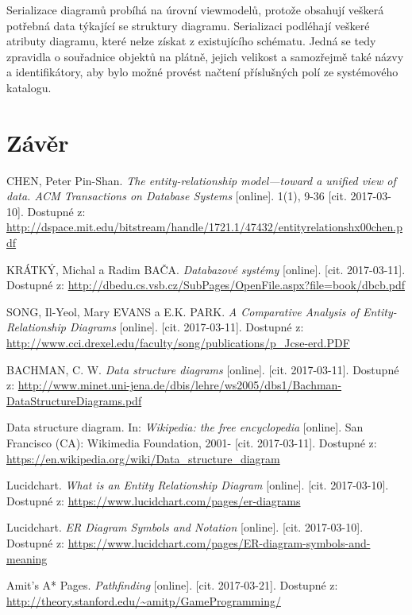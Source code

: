 \documentclass[czech,bachelor,public,dept460,male,oneside]{diploma}
\begin{document}
	Serializace diagramů probíhá na úrovní viewmodelů, protože obsahují veškerá potřebná data týkající se struktury diagramu. Serializaci podléhají veškeré atributy diagramu, které nelze získat z existujícího schématu. Jedná se tedy zpravidla o souřadnice objektů na plátně, jejich velikost a samozřejmě také názvy a identifikátory, aby bylo možné provést načtení příslušných polí ze systémového katalogu. 

\newpage
\section{Závěr}

\newpage
\begin{thebibliography}{99}
	 CHEN, Peter Pin-Shan. \textit{The entity-relationship model---toward a unified view of data. ACM Transactions on Database Systems} [online]. 1(1), 9-36 [cit. 2017-03-10]. Dostupné z: \url{http://dspace.mit.edu/bitstream/handle/1721.1/47432/entityrelationshx00chen.pdf}
	
	 KRÁTKÝ, Michal a Radim BAČA. \textit{Databazové systémy} [online]. [cit. 2017-03-11]. Dostupné z: \url{http://dbedu.cs.vsb.cz/SubPages/OpenFile.aspx?file=book/dbcb.pdf}
	
	 SONG, Il-Yeol, Mary EVANS a E.K. PARK. \textit{A Comparative Analysis of Entity-Relationship Diagrams} [online]. [cit. 2017-03-11]. Dostupné z: \url{http://www.cci.drexel.edu/faculty/song/publications/p_Jcse-erd.PDF}
	
	 BACHMAN, C. W. \textit{Data structure diagrams} [online]. [cit. 2017-03-11]. Dostupné z: \url{http://www.minet.uni-jena.de/dbis/lehre/ws2005/dbs1/Bachman-DataStructureDiagrams.pdf}
	
	 Data structure diagram. In: \textit{Wikipedia: the free encyclopedia} [online]. San Francisco (CA): Wikimedia Foundation, 2001- [cit. 2017-03-11]. Dostupné z: \url{https://en.wikipedia.org/wiki/Data_structure_diagram}
	
	Lucidchart. \textit{What is an Entity Relationship Diagram} [online]. [cit. 2017-03-10]. Dostupné z: \url{https://www.lucidchart.com/pages/er-diagrams}
	
	Lucidchart. \textit{ER Diagram Symbols and Notation} [online]. [cit. 2017-03-10]. Dostupné z: \url{https://www.lucidchart.com/pages/ER-diagram-symbols-and-meaning}
	
	Amit’s A* Pages. \textit{Pathfinding} [online]. [cit. 2017-03-21]. Dostupné z: \url{http://theory.stanford.edu/~amitp/GameProgramming/}
\end{thebibliography}
\end{document}
